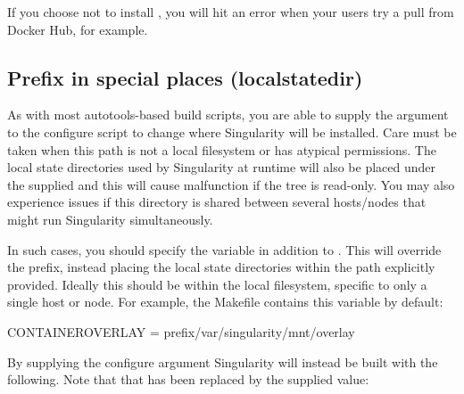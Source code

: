 \documentclass[letterpaper,10pt,english]{sphinxmanual}
\begin{document}
If you choose not to install , you will hit an error when your users try
a pull from Docker Hub, for example.


\subsection{Prefix in special places (\textendash{}localstatedir)}
\label{\detokenize{admin_quickstart:prefix-in-special-places-localstatedir}}
As with most autotools-based build scripts, you are able to supply the 
argument to the configure script to change where Singularity will be
installed. Care must be taken when this path is not a local filesystem
or has atypical permissions. The local state directories used by
Singularity at runtime will also be placed under the supplied  and this
will cause malfunction if the tree is read-only. You may also
experience issues if this directory is shared between several
hosts/nodes that might run Singularity simultaneously.

In such cases, you should specify the  variable in addition to . This
will override the prefix, instead placing the local state directories
within the path explicitly provided. Ideally this should be within the
local filesystem, specific to only a single host or node.
For example, the Makefile contains this variable by default:

%
\begin{sphinxVerbatim}[commandchars=\\\{\}]
CONTAINER\PYGZus{}OVERLAY = \PYGZdl{}\PYGZob{}prefix\PYGZcb{}/var/singularity/mnt/overlay
\end{sphinxVerbatim}

By supplying the configure argument  Singularity will instead be built
with the following. Note that  that has been replaced by the supplied
value:

%
\begin{sphinxVerbatim}[commandchars=\\\{\}]
  
\end{sphinxVerbatim}
\end{document}
